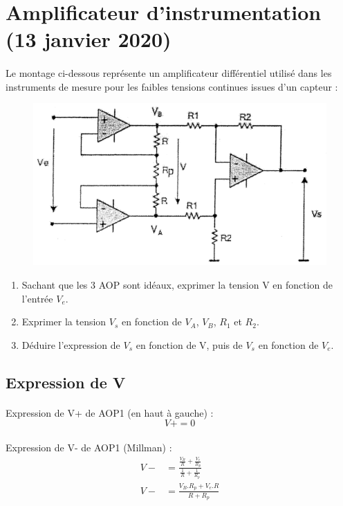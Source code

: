 \documentclass{article}
\begin{document}
\newpage
\section{Amplificateur d'instrumentation (13 janvier 2020)}
\paragraph{}
Le montage ci-dessous représente un amplificateur différentiel utilisé dans les instruments de mesure pour les faibles tensions continues issues d'un capteur :
\begin{figure}[H]
    \centering
    \includegraphics[width=0.6\linewidth]{./images/AOP3.png}
\end{figure}

\begin{enumerate}
    \item Sachant que les 3 AOP sont idéaux, exprimer la tension V en fonction de l'entrée $V_e$.
    \item Exprimer la tension $V_s$ en fonction de $V_A$, $V_B$, $R_1$ et $R_2$.
    \item Déduire l'expression de $V_s$ en fonction de V, puis de $V_s$ en fonction de $V_e$.
\end{enumerate}

\subsection{Expression de V}
\paragraph{}Expression de V+ de AOP1 (en haut à gauche) :
$$V+ = 0$$

\paragraph{}Expression de V- de AOP1 (Millman) :
\begin{align*}
    V- &= \frac{ \frac{V_B}{R} + \frac{V_e}{R_p} } { \frac{1}{R} + \frac{1}{R_p} }\\
    V- &= \frac{ V_B.R_p + V_e.R } { R + R_p }\\
\end{align*}
\end{document}
